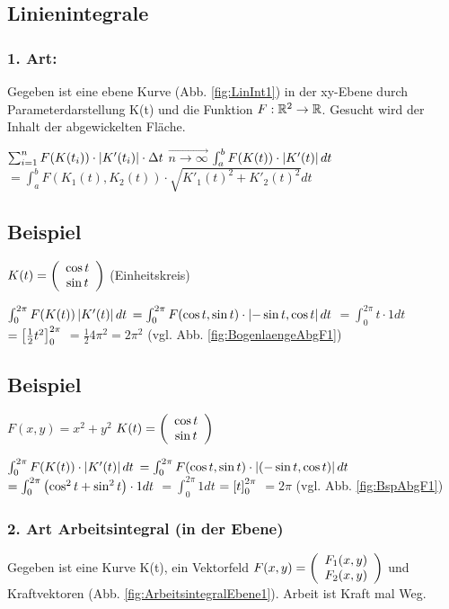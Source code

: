 \subsection{Linienintegrale}

\subsubsection{1. Art:} Gegeben ist eine ebene Kurve (Abb. \ref{fig:LinInt1}) in der xy-Ebene durch Parameterdarstellung K(t) und die Funktion $F: \mathbb{R}^2 \rightarrow \mathbb{R}$.
Gesucht wird der Inhalt der abgewickelten Fläche. 

$\sum_{i=1}^{n} F(K(t_i)) \cdot  \left\vert K'(t_i) \right\vert  \cdot \Delta t $
$\overrightarrow{n \rightarrow \infty}  $ 
$\int_{a}^{b} F(K(t)) \cdot  \left\vert K'(t) \right\vert  dt$
$=\int_{a}^{b} F(K_1(t), K_2(t)) \cdot \sqrt{K'_1(t)^2 + K'_2(t)^2} dt$

\subsection{Beispiel}
$ K(t) =   \left(  \begin{array}{c} \cos t \\ \sin t \end{array}  \right)   $ (Einheitskreis)

$\int_{0}^{2\pi} F(K(t))  \left\vert K'(t) \right\vert  dt$
$=\int_{0}^{2\pi} F(\cos t, \sin t) \cdot  \left\vert - \sin t, \cos t \right\vert  dt$
$=\int_{0}^{2\pi} t \cdot 1 dt $
$= \left[ \frac{1}{2} t^2 \right] _0^{2\pi}$
$=\frac{1}{2} 4\pi^2 = 2\pi^2$ (vgl. Abb. \ref{fig:BogenlaengeAbgF1})

\subsection{Beispiel}
$F(x,y) = x^2 + y^2$
$K(t) =   \left(  \begin{array}{c} \cos t \\ \sin t \end{array}  \right)  $

$\int_{0}^{2\pi} F(K(t)) \cdot  \left\vert K'(t) \right\vert  dt$
$=\int_{0}^{2\pi} F(\cos t, \sin t) \cdot  \left\vert (-\sin t, \cos t) \right\vert  dt$
$=\int_{0}^{2\pi}  \left( \cos^2 t + \sin^2 t \right)  \cdot 1 dt$
$=\int_{0}^{2\pi} 1 dt$
$=  \left[ t \right] _0^{2\pi} $
$= 2\pi$ (vgl. Abb. \ref{fig:BspAbgF1})

\subsubsection{2. Art Arbeitsintegral (in der Ebene)}
Gegeben ist eine Kurve K(t), ein Vektorfeld $F(x,y) =   \left(  \begin{array}{c} F_1(x,y) \\ F_2(x,y) \end{array}  \right)  $ und Kraftvektoren (Abb. \ref{fig:ArbeitsintegralEbene1}). 
Arbeit ist Kraft mal Weg. 

